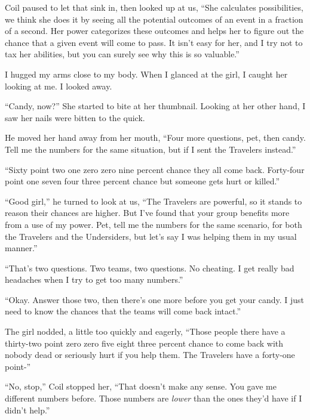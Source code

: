 Coil paused to let that sink in, then looked up at us, ``She calculates possibilities, we think she does it by seeing all the potential outcomes of an event in a fraction of a second.   Her power categorizes these outcomes and helps her to figure out the chance that a given event will come to pass.  It isn't easy for her, and I try not to tax her abilities, but you can surely see why this is so valuable.''



I hugged my arms close to my body.  When I glanced at the girl, I caught her looking at me.  I looked away.



``Candy, now?''  She started to bite at her thumbnail.  Looking at her other hand, I saw her nails were bitten to the quick.



He moved her hand away from her mouth, ``Four more questions, pet, then candy.  Tell me the numbers for the same situation, but if I sent the Travelers instead.''



``Sixty point two one zero zero nine percent chance they all come back.  Forty-four point one seven four three percent chance but someone gets hurt or killed.''



``Good girl,'' he turned to look at us, ``The Travelers are powerful, so it stands to reason their chances are higher.  But I've found that your group benefits more from a use of my power.  Pet, tell me the numbers for the same scenario, for both the Travelers and the Undersiders, but let's say I was helping them in my usual manner.''



``That's two questions.  Two teams, two questions.  No cheating.  I get really bad headaches when I try to get too many numbers.''



``Okay.  Answer those two, then there's one more before you get your candy.  I just need to know the chances that the teams will come back intact.''



The girl nodded, a little too quickly and eagerly, ``Those people there have a thirty-two point zero zero five eight three percent chance to come back with nobody dead or seriously hurt if you help them.  The Travelers have a forty-one point-''



``No, stop,'' Coil stopped her, ``That doesn't make any sense.  You gave me different numbers before.  Those numbers are \emph{lower} than the ones they'd have if I didn't help.''



